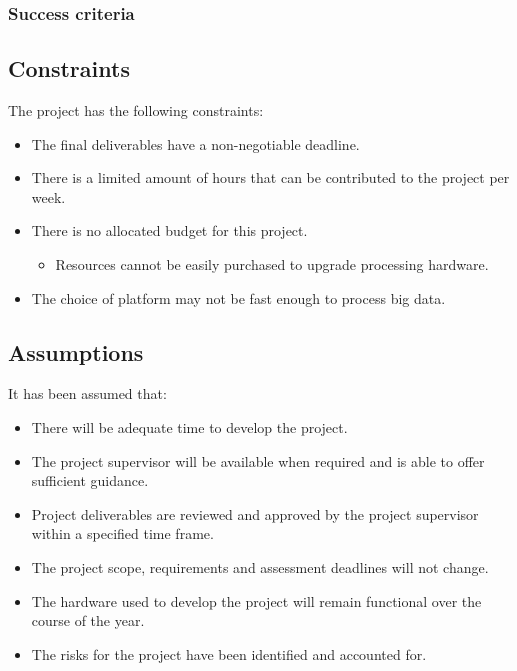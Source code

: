 \documentclass[a4paper]{article}
\begin{document}
{{{			}
			
			\subsubsection{Success criteria} {
			\label{sec:success_critera}
			
			
			}
		
		}
		
		\subsection{Constraints} {
		\label{sec:constraints}
		
			The project has the following constraints:
			
			\begin{itemize}
				\item The final deliverables have a non-negotiable deadline.
				\item There is a limited amount of hours that can be contributed to the project per week.
				\item There is no allocated budget for this project.
				\begin{itemize}
					\item Resources cannot be easily purchased to upgrade processing hardware.
				\end{itemize}
				\item The choice of platform may not be fast enough to process big data.
			\end{itemize}
		
		}
		
		\subsection{Assumptions} {
		\label{sec:assumptions}
		
			It has been assumed that:
			
			\begin{itemize}
				\item There will be adequate time to develop the project.
				\item The project supervisor will be available when required and is able to offer sufficient guidance.
				\item Project deliverables are reviewed and approved by the project supervisor within a specified time frame.
				\item The project scope, requirements and assessment deadlines will not change.
				\item The hardware used to develop the project will remain functional over the course of the year.
				\item The risks for the project have been identified and accounted for.
			\end{itemize}
		
}}
\end{document}
